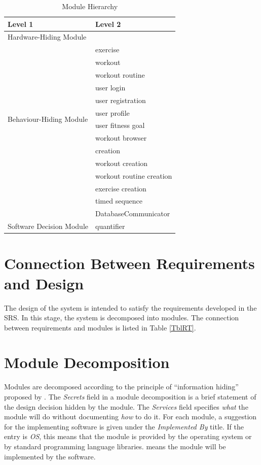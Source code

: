 \documentclass[12pt, titlepage]{article}
\begin{document}
\begin{table}[h!]
\centering
\begin{tabular}{p{} p{}}
\toprule
\textbf{Level 1} & \textbf{Level 2}\\
\midrule

{Hardware-Hiding Module} & ~ \\
\midrule

\multirow{12}{0.3\textwidth}{Behaviour-Hiding Module}
& exercise\\
& workout\\
& workout routine\\
& user login\\
& user registration\\
& user profile\\ 
& user fitness goal\\
& workout browser\\
& creation\\
& workout creation\\
& workout routine creation\\
& exercise creation\\
& timed sequence\\
& DatabaseCommunicator\\
\midrule

\multirow{1}{0.3\textwidth}{Software Decision Module}
& quantifier\\
\bottomrule

\end{tabular}
\caption{Module Hierarchy}
\label{TblMH}
\end{table}

\section{Connection Between Requirements and Design} \label{SecConnection}

The design of the system is intended to satisfy the requirements developed in
the SRS. In this stage, the system is decomposed into modules. The connection
between requirements and modules is listed in Table \ref{TblRT}.

\section{Module Decomposition} \label{SecMD}

Modules are decomposed according to the principle of ``information hiding''
proposed by \citet{ParnasEtAl1984}. The \emph{Secrets} field in a module
decomposition is a brief statement of the design decision hidden by the
module. The \emph{Services} field specifies \emph{what} the module will do
without documenting \emph{how} to do it. For each module, a suggestion for the
implementing software is given under the \emph{Implemented By} title. If the
entry is \emph{OS}, this means that the module is provided by the operating
system or by standard programming language libraries.  \emph{\progname{}} means the
module will be implemented by the \progname{} software.
\end{document}
